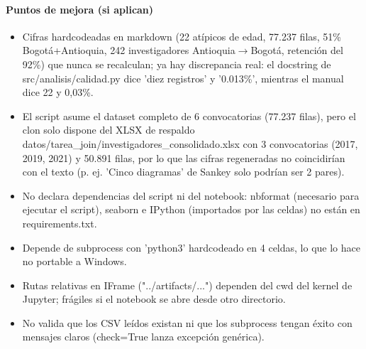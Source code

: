 \paragraph{Puntos de mejora (si aplican)}
\begin{itemize}
  \item Cifras hardcodeadas en markdown (22 atípicos de edad, 77.237 filas, 51\% Bogotá+Antioquia, 242 investigadores Antioquia$\rightarrow$Bogotá, retención del 92\%) que nunca se recalculan; ya hay discrepancia real: el docstring de src/analisis/calidad.py dice 'diez registros' y '0.013\%', mientras el manual dice 22 y 0,03\%.
  \item El script asume el dataset completo de 6 convocatorias (77.237 filas), pero el clon solo dispone del XLSX de respaldo datos/tarea\_join/investigadores\_consolidado.xlsx con 3 convocatorias (2017, 2019, 2021) y 50.891 filas, por lo que las cifras regeneradas no coincidirían con el texto (p. ej. 'Cinco diagramas' de Sankey solo podrían ser 2 pares).
  \item No declara dependencias del script ni del notebook: nbformat (necesario para ejecutar el script), seaborn e IPython (importados por las celdas) no están en requirements.txt.
  \item Depende de subprocess con 'python3' hardcodeado en 4 celdas, lo que lo hace no portable a Windows.
  \item Rutas relativas en IFrame ("../artifacts/...") dependen del cwd del kernel de Jupyter; frágiles si el notebook se abre desde otro directorio.
  \item No valida que los CSV leídos existan ni que los subprocess tengan éxito con mensajes claros (check=True lanza excepción genérica).
\end{itemize}

